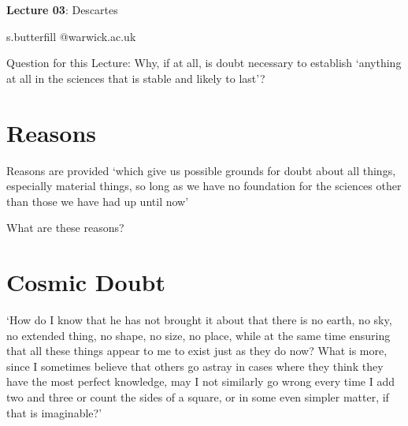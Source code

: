 \documentclass[12pt]{extarticle}
\date{}
\makeatletter
\def \ititle {Descartes}
\def \isubtitle {Lecture 02}
\def \iemail{s.butterfill @warwick.ac.uk}
\makeatother
\begin{document}
\begin{multicols*}{3}

\setlength\footnotesep{1em}









      
\def \ititle {Lecture 03}
 
\def \isubtitle {Descartes}
 
\begin{center}
 
{\Large
 
\textbf{\ititle}: \isubtitle
 
}
 
 
 
\iemail %
 
\end{center}
 
Question for this Lecture:
Why, if at all, is doubt necessary to establish ‘anything at all in the sciences that is stable and likely to last’?

\section{Reasons}
Reasons are provided ‘which give us possible grounds for doubt about all things, especially material things,  
so long as we have no foundation for the sciences other than those we have had up until now’

What are these reasons?
 
 
 
\section{Cosmic Doubt}
‘How do I know that he has not brought it about that there is no earth, 
no sky, no extended thing, no shape, no size, no place, while at the same 
time ensuring that all these things appear to me to exist just as they do now? 
What is more, since I sometimes believe that others go astray in cases 
where they think they have the most perfect knowledge, 
may I not similarly go wrong every time I add two and three or count the 
sides of a square, or in some even simpler matter, if that is imaginable?’
 

\end{multicols*}
\end{document}
